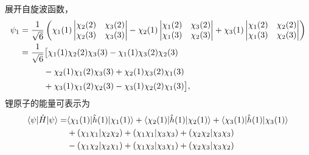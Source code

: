 展开自旋波函数，
\begin{align}
    \psi_1&= 
    \frac1{\sqrt6} \left(
        \chi_1(1) \left|\begin{matrix}
            \chi_2(2) & \chi_3(2) \\
            \chi_2(3) & \chi_3(3)
        \end{matrix}
        \right|
        -
        \chi_2(1) \left|\begin{matrix}
            \chi_1(2) & \chi_3(2) \\
            \chi_1(3) & \chi_2(3)
        \end{matrix}
        \right|
        +
        \chi_3(1) \left|\begin{matrix}
            \chi_1(2) & \chi_2(2) \\
            \chi_1(3) & \chi_2(3)
        \end{matrix}
        \right|
    \right)
    \notag
    \\
    & =\frac{1}{\sqrt{6}}\big[\chi_1(1) \chi_2(2) \chi_3(3)-\chi_1(1) \chi_3(2) \chi_2(3)\notag \\
    & \phantom{=\sqrt6\big[}-\chi_2(1) \chi_1(2) \chi_3(3)+\chi_2(1) \chi_3(2) \chi_1(3) \notag \\
    &\phantom{=\sqrt6\big[}+\chi_3(1) \chi_1(2) \chi_2(3)-\chi_3(1) \chi_2(2) \chi_1(3) \big],
\end{align}
锂原子的能量可表示为
\begin{align}
\langle \psi | \hat H | \psi \rangle =&{} 
\langle \chi_1(1) | \hat h(1) | \chi_1(1) \rangle + 
\langle \chi_2(1) | \hat h(1) | \chi_2(1) \rangle + 
\langle \chi_3(1) | \hat h(1) | \chi_3(1) \rangle  \notag \\
&{}+(\chi_1\chi_1|\chi_2\chi_2) + (\chi_1\chi_1|\chi_3\chi_3) + (\chi_2\chi_2|\chi_3\chi_3) \notag \\
&{}-(\chi_1\chi_2|\chi_2\chi_1) + (\chi_1\chi_3|\chi_3\chi_1) + (\chi_2\chi_3|\chi_3\chi_2)
\end{align}
